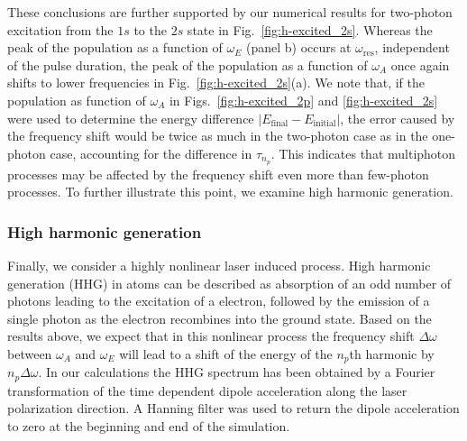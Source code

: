 These conclusions are further supported by our numerical results for two-photon excitation from the $1s$ to the $2s$ state in Fig.~\ref{fig:h-excited_2s}. Whereas the peak of the population as a function of $\omega_E$ (panel b) occurs at $\omega_\text{res}$, independent of the pulse duration, the peak of the population as a function of  $\omega_A$ once again shifts to lower frequencies in Fig.~\ref{fig:h-excited_2s}(a). We note that, if the population as function of $\omega_A$ in Figs.~\ref{fig:h-excited_2p} and \ref{fig:h-excited_2s} were used to determine the energy difference $|E_\text{final} - E_\text{initial}|$, the error caused by the frequency shift would be twice as much in the two-photon case as in the one-photon case, accounting for the difference in $\tau_{n_p}$. This indicates that multiphoton processes may be affected by the frequency shift even more than few-photon processes. To further illustrate this point, we examine high harmonic generation.

\subsubsection{High harmonic generation}
\label{sec:HHG}

Finally, we consider a highly nonlinear laser induced process. High harmonic generation (HHG) in atoms can be described as absorption of an odd number of photons leading to the excitation of a electron, followed by the emission of a single photon as the electron recombines into the ground state. Based on the results above, we expect that in this nonlinear process the frequency shift $\Delta\omega$ between $\omega_A$ and $\omega_E$ will lead to a shift of the energy of the $n_p$th harmonic by $n_p\Delta\omega$. In our calculations the HHG spectrum has been obtained by a Fourier transformation of the time dependent dipole acceleration along the laser polarization direction. A Hanning filter was used to return the dipole acceleration to zero at the beginning and end of the simulation. 


